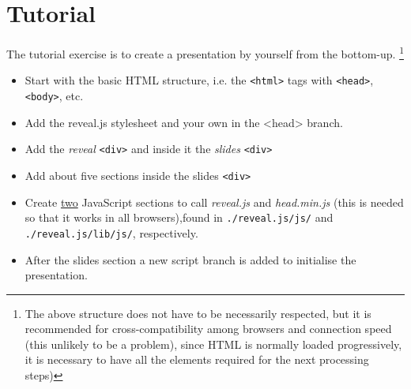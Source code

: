 \documentclass[11pt,a4paper,final]{article}
\begin{document}
\section{Tutorial}
The tutorial exercise is to create a presentation by yourself from the bottom-up.
\footnote{The above structure does not have to be necessarily respected, but it is recommended for cross-compatibility among browsers and connection speed (this unlikely to be a problem), since HTML is normally loaded progressively, it is necessary to have all the elements required for the next processing steps)}
\begin{itemize}
\item Start with the basic HTML structure, i.e. the \texttt{<html>} tags with \texttt{<head>}, \texttt{<body>}, etc.
\item Add the reveal.js stylesheet and your own in the <head> branch.
\item Add the \textit{reveal} \texttt{<div>} and inside it the \textit{slides} \texttt{<div>}
\item Add about five sections inside the slides \texttt{<div>}
\item Create \underline{two} JavaScript sections to call \textit{reveal.js} and \textit{head.min.js} (this is needed so that it works in all browsers),found in \texttt{./reveal.js/js/} and \texttt{./reveal.js/lib/js/}, respectively.
\item After the slides section a new script branch is added to initialise the presentation.
\end{itemize}
\end{document}
